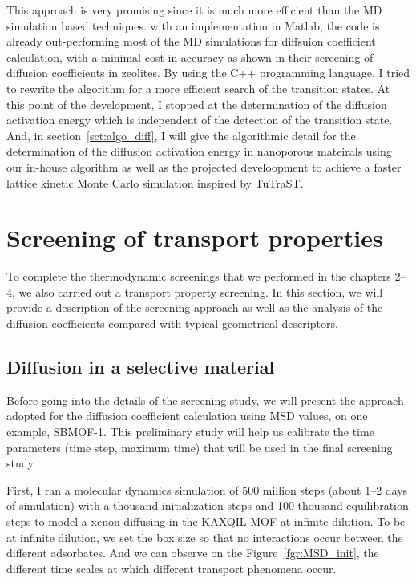 \documentclass[main]{subfiles}
\begin{document}

This approach is very promising since it is much more efficient than the MD simulation based techniques. with an implementation in Matlab, the code is already out-performing most of the MD simulations for diffsuion coefficient calculation, with a minimal cost in accuracy as shown in their screening of diffusion coefficients in zeolites. By using the C++ programming language, I tried to rewrite the algorithm for a more efficient search of the transition states. At this point of the development, I stopped at the determination of the diffusion activation energy which is independent of the detection of the transition state. And, in section~\ref{sct:algo_diff}, I will give the algorithmic detail for the determination of the diffusion activation energy in nanoporous mateirals using our in-house algorithm as well as the projected develoopment to achieve a faster lattice kinetic Monte Carlo simulation inspired by TuTraST.


\section{Screening of transport properties}\label{sct:md_screening}

To complete the thermodynamic screenings that we performed in the chapters 2--4, we also carried out a transport property screening. In this section, we will provide a description of the screening approach as well as the analysis of the diffusion coefficients compared with typical geometrical descriptors.

\subsection{Diffusion in a selective material}

Before going into the details of the screening study, we will present the approach adopted for the diffusion coefficient calculation using MSD values, on one example, SBMOF-1\autocite{Banerjee_2016}. This preliminary study will help us calibrate the time parameters (time step, maximum time) that will be used in the final screening study.

First, I ran a molecular dynamics simulation of 500 million steps (about 1--2 days of simulation) with a thousand initialization steps and 100 thousand equilibration steps to model a xenon diffusing in the KAXQIL\autocite{Banerjee2012} MOF at infinite dilution. To be at infinite dilution, we set the box size so that no interactions occur between the different adsorbates. And we can observe on the Figure~\ref{fgr:MSD_init}, the different time scales at which different transport phenomena occur. 
\end{document}
